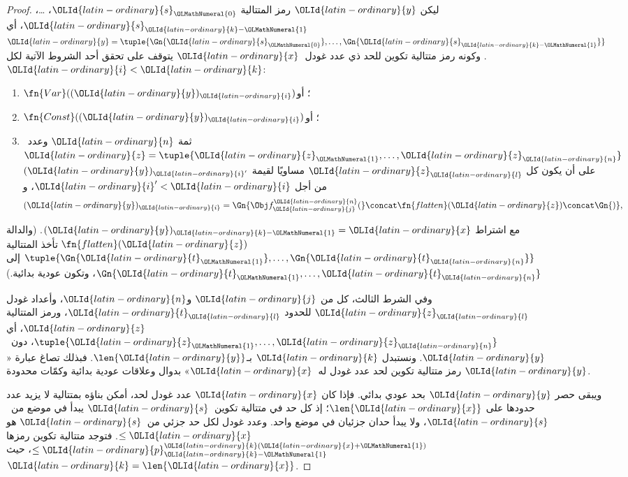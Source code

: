 \documentclass[../../../include/open-logic-section]{subfiles}
\begin{document}
\begin{proof}
ليكن $\OLId{latin-ordinary}{y}$ رمز المتتالية $\OLId{latin-ordinary}{s}_\OLMathNumeral{0}$، \dots، $\OLId{latin-ordinary}{s}_{\OLId{latin-ordinary}{k}-\OLMathNumeral{1}}$،
أي $\OLId{latin-ordinary}{y}=\tuple{\Gn{\OLId{latin-ordinary}{s}_\OLMathNumeral{0}}, \dots, \Gn{\OLId{latin-ordinary}{s}_{\OLId{latin-ordinary}{k}-\OLMathNumeral{1}}}}$.
وكونه رمز متتالية تكوين للحد ذي عدد غودل~$\OLId{latin-ordinary}{x}$
يتوقف على تحقق أحد الشروط الآتية لكل $\OLId{latin-ordinary}{i}<\OLId{latin-ordinary}{k}$:
\begin{enumerate}
\item $\fn{Var}((\OLId{latin-ordinary}{y})_\OLId{latin-ordinary}{i})$؛ أو
\item $\fn{Const}((\OLId{latin-ordinary}{y})_\OLId{latin-ordinary}{i})$؛ أو
\item ثمة $\OLId{latin-ordinary}{n}$ وعدد~$\OLId{latin-ordinary}{z}=\tuple{\OLId{latin-ordinary}{z}_\OLMathNumeral{1}, \dots, \OLId{latin-ordinary}{z}_\OLId{latin-ordinary}{n}}$ على أن يكون كل $\OLId{latin-ordinary}{z}_\OLId{latin-ordinary}{l}$
  مساويًا لقيمة $(\OLId{latin-ordinary}{y})_{\OLId{latin-ordinary}{i}'}$ من أجل $\OLId{latin-ordinary}{i}'<\OLId{latin-ordinary}{i}$، و
\[
(\OLId{latin-ordinary}{y})_\OLId{latin-ordinary}{i} = \Gn{\Obj f^\OLId{latin-ordinary}{n}_\OLId{latin-ordinary}{j}(} \concat \fn{flatten}(\OLId{latin-ordinary}{z}) \concat \Gn{)},
\]
\end{enumerate}
مع اشتراط $(\OLId{latin-ordinary}{y})_{\OLId{latin-ordinary}{k}-\OLMathNumeral{1}}=\OLId{latin-ordinary}{x}$. (والدالة $\fn{flatten}(\OLId{latin-ordinary}{z})$ تأخذ المتتالية
$\tuple{\Gn{\OLId{latin-ordinary}{t}_\OLMathNumeral{1}}, \dots, \Gn{\OLId{latin-ordinary}{t}_\OLId{latin-ordinary}{n}}}$ إلى $\Gn{\OLId{latin-ordinary}{t}_\OLMathNumeral{1}, \dots, \OLId{latin-ordinary}{t}_\OLId{latin-ordinary}{n}}$، وتكون
عودية بدائية.)

وفي الشرط الثالث، كل من $\OLId{latin-ordinary}{j}$ و$\OLId{latin-ordinary}{n}$، وأعداد
غودل $\OLId{latin-ordinary}{z}_\OLId{latin-ordinary}{l}$ للحدود $\OLId{latin-ordinary}{t}_\OLId{latin-ordinary}{l}$، ورمز المتتالية
$\OLId{latin-ordinary}{z}$، أي $\tuple{\OLId{latin-ordinary}{z}_\OLMathNumeral{1}, \dots, \OLId{latin-ordinary}{z}_\OLId{latin-ordinary}{n}}$،
دون~$\OLId{latin-ordinary}{y}$. ونستبدل $\OLId{latin-ordinary}{k}$ بـ$\len{\OLId{latin-ordinary}{y}}$.
فبذلك تصاغ عبارة «$\OLId{latin-ordinary}{y}$ رمز متتالية تكوين
لحد عدد غودل له~$\OLId{latin-ordinary}{x}$» بدوال وعلاقات
عودية بدائية وكمّات محدودة.

ويبقى حصر $\OLId{latin-ordinary}{y}$ بحد عودي بدائي. فإذا كان
$\OLId{latin-ordinary}{x}$ عدد غودل لحد، أمكن بناؤه بمتتالية
لا يزيد عدد حدودها على $\len{\OLId{latin-ordinary}{x}}$؛
إذ كل حد في متتالية تكوين~$\OLId{latin-ordinary}{s}$ يبدأ
في موضع من~$\OLId{latin-ordinary}{s}$، ولا يبدأ حدان جزئيان
في موضع واحد. وعدد غودل لكل حد جزئي
من~$\OLId{latin-ordinary}{s}$ هو $ \le \OLId{latin-ordinary}{x}$. فتوجد متتالية
تكوين رمزها $\le \OLId{latin-ordinary}{p}_{\OLId{latin-ordinary}{k}-\OLMathNumeral{1}}^{\OLId{latin-ordinary}{k}(\OLId{latin-ordinary}{x}+\OLMathNumeral{1})}$،
حيث $\OLId{latin-ordinary}{k}=\len{\OLId{latin-ordinary}{x}}$.


\end{proof}
\end{document}
